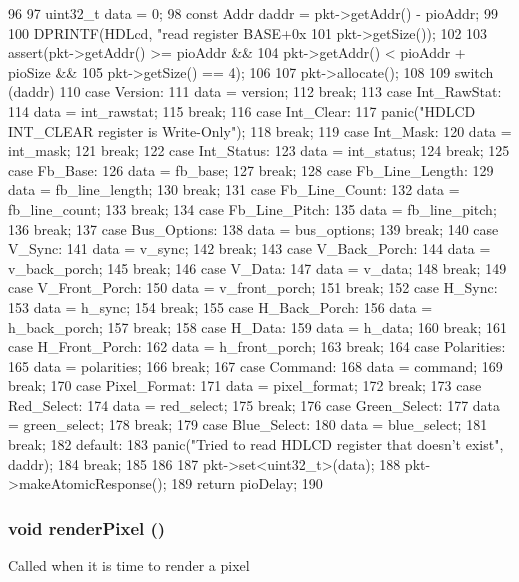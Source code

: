 \begin{DoxyCode}
96 {
97     uint32_t data = 0;
98     const Addr daddr = pkt->getAddr() - pioAddr;
99 
100     DPRINTF(HDLcd, "read register BASE+0x%
101             pkt->getSize());
102 
103     assert(pkt->getAddr() >= pioAddr &&
104             pkt->getAddr() < pioAddr + pioSize &&
105             pkt->getSize() == 4);
106 
107     pkt->allocate();
108 
109     switch (daddr) {
110       case Version:
111         data = version;
112         break;
113       case Int_RawStat:
114         data = int_rawstat;
115         break;
116       case Int_Clear:
117         panic("HDLCD INT_CLEAR register is Write-Only\n");
118         break;
119       case Int_Mask:
120         data = int_mask;
121         break;
122       case Int_Status:
123         data = int_status;
124         break;
125       case Fb_Base:
126         data = fb_base;
127         break;
128       case Fb_Line_Length:
129         data = fb_line_length;
130         break;
131       case Fb_Line_Count:
132         data = fb_line_count;
133         break;
134       case Fb_Line_Pitch:
135         data = fb_line_pitch;
136         break;
137       case Bus_Options:
138         data = bus_options;
139         break;
140       case V_Sync:
141         data = v_sync;
142         break;
143       case V_Back_Porch:
144         data = v_back_porch;
145         break;
146       case V_Data:
147         data = v_data;
148         break;
149       case V_Front_Porch:
150         data = v_front_porch;
151         break;
152       case H_Sync:
153         data = h_sync;
154         break;
155       case H_Back_Porch:
156         data = h_back_porch;
157         break;
158       case H_Data:
159         data = h_data;
160         break;
161       case H_Front_Porch:
162         data = h_front_porch;
163         break;
164       case Polarities:
165         data = polarities;
166         break;
167       case Command:
168         data = command;
169         break;
170       case Pixel_Format:
171         data = pixel_format;
172         break;
173       case Red_Select:
174         data = red_select;
175         break;
176       case Green_Select:
177         data = green_select;
178         break;
179       case Blue_Select:
180         data = blue_select;
181         break;
182       default:
183         panic("Tried to read HDLCD register that doesn't  exist\n", daddr);
184         break;
185     }
186 
187     pkt->set<uint32_t>(data);
188     pkt->makeAtomicResponse();
189     return pioDelay;
190 }
\end{DoxyCode}
\hypertarget{classHDLcd_a0a49e224296b89d614be23179d98d6a3}{
\subsubsection[{renderPixel}]{\setlength{\rightskip}{0pt plus 5cm}void renderPixel ()}}
\label{classHDLcd_a0a49e224296b89d614be23179d98d6a3}
Called when it is time to render a pixel 


